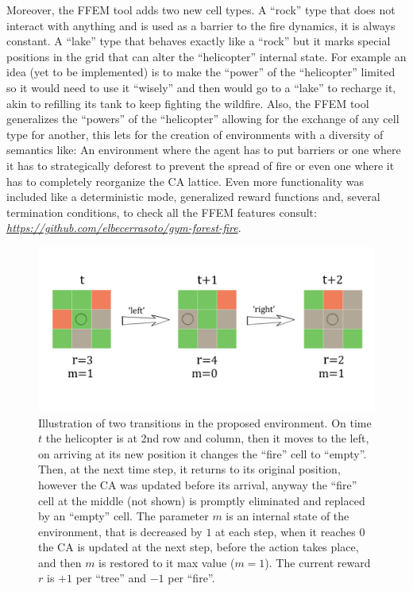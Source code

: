 \documentclass[
  12pt,
  openany]{book}
\begin{document}
Moreover, the FFEM tool adds two new cell types. A ``rock'' type that does not interact with anything and is used as a barrier to the fire dynamics, it is always constant. A ``lake'' type that behaves exactly like a ``rock'' but it marks special positions in the grid that can alter the ``helicopter'' internal state. For example an idea (yet to be implemented) is to make the ``power'' of the ``helicopter'' limited so it would need to use it ``wisely'' and then would go to a ``lake'' to recharge it, akin to refilling its tank to keep fighting the wildfire. Also, the FFEM tool generalizes the ``powers'' of the ``helicopter'' allowing for the exchange of any cell type for another, this lets for the creation of environments with a diversity of semantics like: An environment where the agent has to put barriers or one where it has to strategically deforest to prevent the spread of fire or even one where it has to completely reorganize the CA lattice. Even more functionality was included like a deterministic mode, generalized reward functions and, several termination conditions, to check all the FFEM features consult: \emph{\url{https://github.com/elbecerrasoto/gym-forest-fire}}.



\begin{figure}

{\centering \includegraphics[width=0.8\linewidth]{pics/agent-env_3x3} 

}

\caption{Illustration of two transitions in the proposed environment. On time \(t\) the helicopter is at 2nd row and column, then it moves to the left, on arriving at its new position it changes the ``fire'' cell to ``empty''. Then, at the next time step, it returns to its original position, however the CA was updated before its arrival, anyway the ``fire'' cell at the middle (not shown) is promptly eliminated and replaced by an ``empty'' cell. The parameter \(m\) is an internal state of the environment, that is decreased by \(1\) at each step, when it reaches \(0\) the CA is updated at the next step, before the action takes place, and then \(m\) is restored to it max value (\(m=1\)). The current reward \(r\) is \(+1\) per ``tree'' and \(-1\) per ``fire''.}\label{fig:thesis-3-3-env}
\end{figure}
\end{document}
